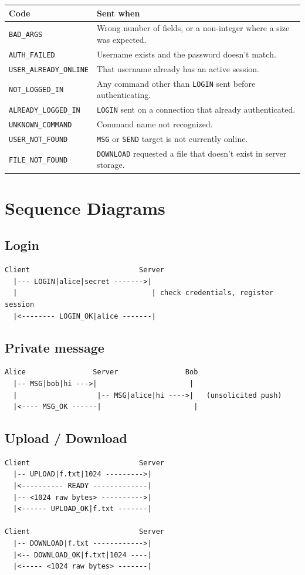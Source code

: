 \documentclass[11pt]{article}
\newcommand{\cmd}[1]{\texttt{#1}}
\begin{document}
\begin{longtable}{@{}p{4.3cm}p{10.2cm}@{}}
\toprule
\textbf{Code} & \textbf{Sent when} \\
\midrule
\endhead
\cmd{BAD\_ARGS} & Wrong number of fields, or a non-integer where a size was expected. \\
\cmd{AUTH\_FAILED} & Username exists and the password doesn't match. \\
\cmd{USER\_ALREADY\_ONLINE} & That username already has an active session. \\
\cmd{NOT\_LOGGED\_IN} & Any command other than \cmd{LOGIN} sent before authenticating. \\
\cmd{ALREADY\_LOGGED\_IN} & \cmd{LOGIN} sent on a connection that already authenticated. \\
\cmd{UNKNOWN\_COMMAND} & Command name not recognized. \\
\cmd{USER\_NOT\_FOUND} & \cmd{MSG} or \cmd{SEND} target is not currently online. \\
\cmd{FILE\_NOT\_FOUND} & \cmd{DOWNLOAD} requested a file that doesn't exist in server storage. \\
\bottomrule
\end{longtable}

\section{Sequence Diagrams}

\subsection{Login}
\begin{verbatim}
Client                          Server
  |--- LOGIN|alice|secret ------->|
  |                                | check credentials, register session
  |<-------- LOGIN_OK|alice -------|
\end{verbatim}

\subsection{Private message}
\begin{verbatim}
Alice                Server                Bob
  |-- MSG|bob|hi --->|                      |
  |                   |-- MSG|alice|hi ---->|   (unsolicited push)
  |<---- MSG_OK ------|                      |
\end{verbatim}

\subsection{Upload / Download}
\begin{verbatim}
Client                          Server
  |-- UPLOAD|f.txt|1024 --------->|
  |<---------- READY -------------|
  |-- <1024 raw bytes> ---------->|
  |<------ UPLOAD_OK|f.txt -------|

Client                          Server
  |-- DOWNLOAD|f.txt ------------>|
  |<-- DOWNLOAD_OK|f.txt|1024 ----|
  |<----- <1024 raw bytes> -------|
\end{verbatim}
\end{document}
